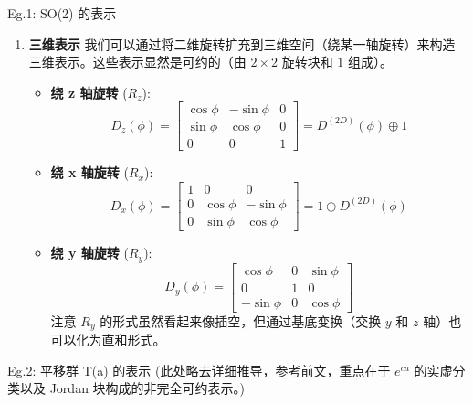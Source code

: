 \begin{example}{Eg.1: SO(2) 的表示}
\begin{enumerate}
        \item \textbf{三维表示}
    我们可以通过将二维旋转扩充到三维空间（绕某一轴旋转）来构造三维表示。这些表示显然是可约的（由 $2 \times 2$ 旋转块和 $1$ 组成）。
    \begin{itemize}
        \item \textbf{绕 z 轴旋转} ($R_z$):
        \begin{equation}
            D_z(\phi) = \begin{bmatrix} \cos\phi & -\sin\phi & 0 \\ \sin\phi & \cos\phi & 0 \\ 0 & 0 & 1 \end{bmatrix} = D^{(2D)}(\phi) \oplus 1
        \end{equation}
        \item \textbf{绕 x 轴旋转} ($R_x$):
        \begin{equation}
            D_x(\phi) = \begin{bmatrix} 1 & 0 & 0 \\ 0 & \cos\phi & -\sin\phi \\ 0 & \sin\phi & \cos\phi \end{bmatrix} = 1 \oplus D^{(2D)}(\phi)
        \end{equation}
        \item \textbf{绕 y 轴旋转} ($R_y$):
        \begin{equation}
            D_y(\phi) = \begin{bmatrix} \cos\phi & 0 & \sin\phi \\ 0 & 1 & 0 \\ -\sin\phi & 0 & \cos\phi \end{bmatrix}
        \end{equation}
        注意 $R_y$ 的形式虽然看起来像插空，但通过基底变换（交换 $y$ 和 $z$ 轴）也可以化为直和形式。
    \end{itemize}
        \end{enumerate}
\end{example}

\begin{example}{Eg.2: 平移群 T(a) 的表示}
    (此处略去详细推导，参考前文，重点在于 $e^{ca}$ 的实虚分类以及 Jordan 块构成的非完全可约表示。)
\end{example}

